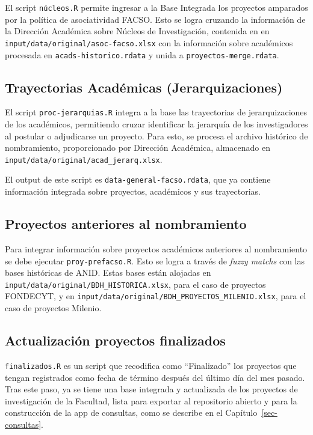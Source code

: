 \documentclass[
  spanish,
  letterpaper,
  DIV=11,
  numbers=noendperiod]{scrreprt}
\begin{document}
El script \texttt{núcleos.R} permite ingresar a la Base Integrada los
proyectos amparados por la política de asociatividad FACSO. Esto se
logra cruzando la información de la Dirección Académica sobre Núcleos de
Investigación, contenida en en
\texttt{input/data/original/asoc-facso.xlsx} con la información sobre
académicos procesada en \texttt{acads-historico.rdata} y unida a
\texttt{proyectos-merge.rdata}.

\subsection{Trayectorias Académicas
(Jerarquizaciones)}\label{trayectorias-acaduxe9micas-jerarquizaciones}

El script \texttt{proc-jerarquias.R} integra a la base las trayectorias
de jerarquizaciones de los académicos, permitiendo cruzar identificar la
jerarquía de los investigadores al postular o adjudicarse un proyecto.
Para esto, se procesa el archivo histórico de nombramiento,
proporcionado por Dirección Académica, almacenado en
\texttt{input/data/original/acad\_jerarq.xlsx}.

El output de este script es \texttt{data-general-facso.rdata}, que ya
contiene información integrada sobre proyectos, académicos y sus
trayectorias.

\subsection{Proyectos anteriores al
nombramiento}\label{proyectos-anteriores-al-nombramiento}

Para integrar información sobre proyectos académicos anteriores al
nombramiento se debe ejecutar \texttt{proy-prefacso.R}. Esto se logra a
través de \emph{fuzzy matchs} con las bases históricas de ANID. Estas
bases están alojadas en
\texttt{input/data/original/BDH\_HISTORICA.xlsx}, para el caso de
proyectos FONDECYT, y en
\texttt{input/data/original/BDH\_PROYECTOS\_MILENIO.xlsx}, para el caso
de proyectos Milenio.

\subsection{Actualización proyectos
finalizados}\label{actualizaciuxf3n-proyectos-finalizados}

\texttt{finalizados.R} es un script que recodifica como ``Finalizado''
los proyectos que tengan registrados como fecha de término después del
último día del mes pasado. Tras este paso, ya se tiene una base
integrada y actualizada de los proyectos de investigación de la
Facultad, lista para exportar al repositorio abierto y para la
construcción de la app de consultas, como se describe en el
Capítulo~\ref{sec-consultas}.
\end{document}

